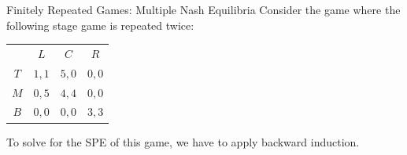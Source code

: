 \documentclass[10pt]{extarticle}
\begin{document}
  \begin{problem}{Finitely Repeated Games: Multiple Nash Equilibria}
    Consider the game where the following stage game is repeated twice:
    \begin{center}
      \renewcommand{\arraystretch}{1.5}
      \begin{tabular}{c|c|c|c|}
        \multicolumn{1}{c}{} & \multicolumn{1}{c}{$L$}& \multicolumn{1}{c}{$C$}& \multicolumn{1}{c}{$R$}\\
        \cline{2-4}
        $T$ & $1,1$ & $5,0$ & $0,0$\\
        \cline{2-4}
        $M$ & $0,5$ & $4,4$ & $0,0$\\
        \cline{2-4}
        $B$ & $0,0$ & $0,0$ & $3,3$\\
        \cline{2-4}
      \end{tabular}
    \end{center}
    To solve for the SPE of this game, we have to apply backward induction.\\


\end{problem}
\end{document}
